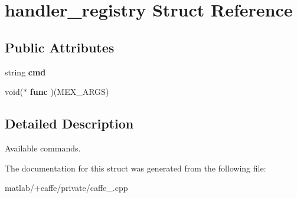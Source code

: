 \hypertarget{structhandler__registry}{}\section{handler\+\_\+registry Struct Reference}
\label{structhandler__registry}
\subsection*{Public Attributes}
\begin{DoxyCompactItemize}
\item 
\mbox{\label{structhandler__registry_a1fd51b4a4d8602d23c474eb9dac73bfb}} 
string {\bfseries cmd}
\item 
\mbox{\label{structhandler__registry_ab1128950c7dba59569dcc1b8dcb45737}} 
void($\ast$ {\bfseries func} )(M\+E\+X\+\_\+\+A\+R\+GS)
\end{DoxyCompactItemize}


\subsection{Detailed Description}


 Available commands. 

The documentation for this struct was generated from the following file\+:\begin{DoxyCompactItemize}
\item 
matlab/+caffe/private/caffe\+\_\+.\+cpp\end{DoxyCompactItemize}
